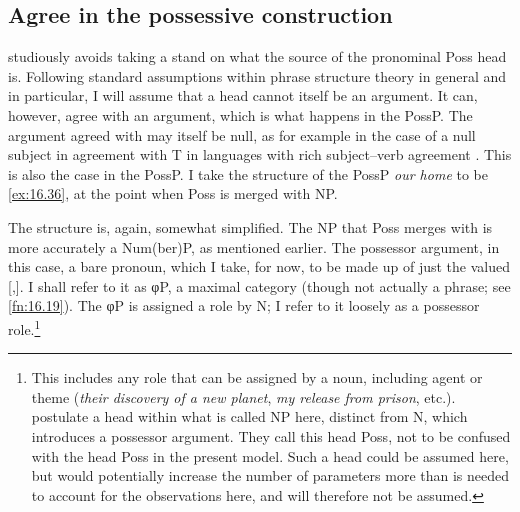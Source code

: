 \documentclass[output=paper]{langsci/langscibook}
\begin{document}
\subsection{Agree in the possessive construction}\label{sec:16.3.3}

\citet{Delsing1998} studiously avoids taking a stand on what the source of the
pronominal Poss head is. Following standard assumptions within phrase structure
theory in general and \citet{Roberts2010} in particular, I will assume that a
head cannot itself be an argument. It can, however, agree with an argument,
which is what happens in the PossP. The argument agreed with may itself be
null, as for example in the case of a null subject in agreement with T in
languages with rich subject--verb agreement
\citep[passim]{BibHolRobShee2010}.  This is also the case in the PossP.
I take the structure of the PossP \emph{our home} to be \eqref{ex:16.36},
at the point when Poss is merged with NP.

\ea\label{ex:16.36}
\z

The structure is, again, somewhat simplified. The NP that Poss merges with is
more accurately a Num(ber)P, as mentioned earlier. The possessor argument, in
this case, a bare pronoun, which I take, for now, to be made up of just the
valued  [\First,\Pl{}]. I shall refer to it as φP, a maximal category
(though not actually a phrase; see \cref{fn:16.19}). The φP is assigned a role by N; I
refer to it loosely as a possessor role.\footnote{This includes any role that
    can be assigned by a noun, including agent or theme (\emph{their discovery
    of a new planet}, \emph{my release from prison}, etc.).
    \citet{AleHaeSta2007} postulate a head within what is called NP here,
    distinct from N, which introduces a possessor argument. They call this head
    Poss, not to be confused with the head Poss in the present model. Such a
    head could be assumed here, but would potentially increase the number of
parameters more than is needed to account for the observations here, and will
therefore not be assumed.\label{fn:16.18}}
\end{document}
